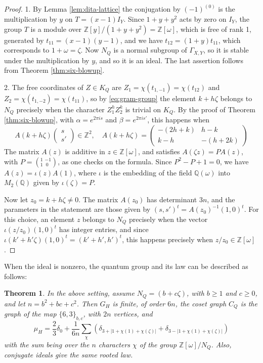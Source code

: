 \documentclass[11pt,reqno]{amsart}
\newtheorem{thm}{Theorem}[section]
\theoremstyle{definition}
\numberwithin{equation}{section}
\begin{document}
\begin{proof}
1. By Lemma \ref{lem:dita-lattice} the conjugation by $(-1)^{(0)}$ is the multiplication by $y$ on $T=(x-1)I_Y$. Since $1+y+y^2$ acts by zero on $I_Y$, the group $T$ is a module over $\mathbb Z[y]/(1+y+y^2)=\mathbb Z[\omega]$, which is free of rank 1, generated by $t_{11}=(x-1)(y-1)$, and we have $t_{12}=(1+y)t_{11}$, which corresponds to $1+\omega=\zeta$. Now $N_Q$ is a normal subgroup of $\Gamma_{X,Y}$, so it is stable under the multiplication by $y$, and so it is an ideal. The last assertion follows from Theorem \ref{thm:six-blowup}.

2. The free coordinates of $Z\in K_Q$ are $Z_1=\chi(t_{1,-1})=\chi(t_{12})$ and $Z_2=\chi(t_{1,-2})=\chi(t_{11})$, so by \eqref{eq:gram-group} the element $k+h\zeta$ belongs to $N_Q$ precisely when the character $Z_1^hZ_2^k$ is trivial on $K_Q$. By the proof of Theorem \ref{thm:six-blowup}, with $\alpha=e^{2\pi i s}$ and $\beta=e^{2\pi i s'}$, this happens when
$$A(k+h\zeta)\begin{pmatrix}s\\ s'\end{pmatrix}\in\mathbb Z^2,\quad
A(k+h\zeta)=\begin{pmatrix}-(2h+k)&h-k\\ k-h&-(h+2k)\end{pmatrix}$$
The matrix $A(z)$ is additive in $z\in\mathbb Z[\omega]$, and satisfies $A(\zeta z)=PA(z)$, with $P=(^1_1{\ }^{-1}_{\ 0})$, as one checks on the formula. Since $P^2-P+1=0$, we have $A(z)=\iota(z)A(1)$, where $\iota$ is the embedding of the field $\mathbb Q(\omega)$ into $M_2(\mathbb Q)$ given by $\iota(\zeta)=P$.

Now let $z_0=k+h\zeta\neq0$. The matrix $A(z_0)$ has determinant $3n$, and the parameters in the statement are those given by $(s,s')^t=A(z_0)^{-1}(1,0)^t$. For this choice, an element $z$ belongs to $N_Q$ precisely when the vector $\iota(z/z_0)(1,0)^t$ has integer entries, and since $\iota(k'+h'\zeta)(1,0)^t=(k'+h',h')^t$, this happens precisely when $z/z_0\in\mathbb Z[\omega]$.
\end{proof}

When the ideal is nonzero, the quantum group and its law can be described as follows:

\begin{thm}\label{thm:eisenstein-finite}
In the above setting, assume $N_Q=(b+c\zeta)$, with $b\geq1$ and $c\geq0$, and let $n=b^2+bc+c^2$. Then $G_H$ is finite, of order $6n$, the coset graph $C_Q$ is the graph of the map $\{6,3\}_{b,c}$, with $2n$ vertices, and
$$\mu_H=\frac23\delta_0+\frac1{6n}\sum_\chi\left(\delta_{3+|1+\chi(1)+\chi(\zeta)|}+\delta_{3-|1+\chi(1)+\chi(\zeta)|}\right)$$
with the sum being over the $n$ characters $\chi$ of the group $\mathbb Z[\omega]/N_Q$. Also, conjugate ideals give the same rooted law.
\end{thm}
\end{document}

